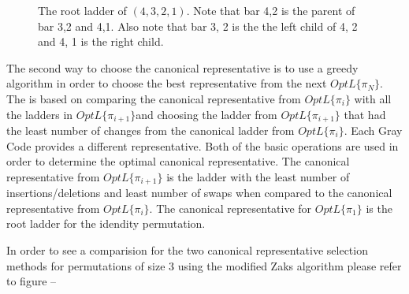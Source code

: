 \begin{figure}[!htp]
    \begin{center}
    \end{center}
    \caption{The root ladder of $(4,3,2,1)$. Note that bar 4,2 is the parent of bar 3,2 and 4,1. Also note that 
    bar 3, 2 is the the left child of 4, 2 and 4, 1 is the right child.}
\end{figure}

The second way to choose the canonical representative is to use a greedy algorithm 
in order to choose the best representative from the next $OptL\{\pi_{N}\}$. 
The is based on comparing the canonical representative from $OptL\{\pi_{i}\}$ with all the ladders in
$OptL\{\pi_{i+1}\}$and choosing the ladder from $OptL\{\pi_{i+1}\}$ that had the least number of 
changes from the canonical ladder from $OptL\{\pi_{i}\}$. Each Gray Code provides a different representative.
Both of the basic operations are used in order to determine the optimal canonical representative.
The canonical representative from $OptL\{\pi_{i+1}\}$ is the ladder with the least number of insertions/deletions 
and least number of swaps when compared to the canonical representative from $OptL\{\pi_{i}\}$.
The canonical representative for $OptL\{\pi_{1}\}$ is the root ladder for the idendity permutation.\par 
In order to see a comparision for the two canonical representative selection methods for permutations of 
size 3 using the modified Zaks algorithm please refer to figure --\pagebreak


